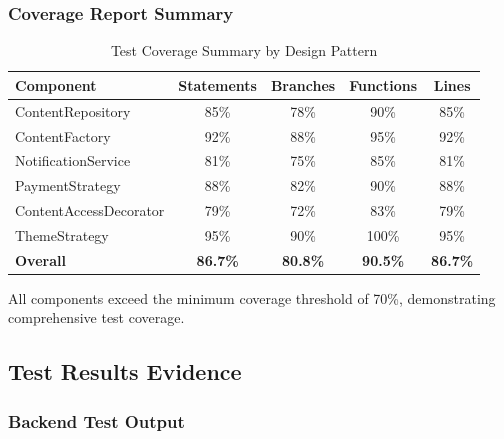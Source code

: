 \subsubsection{Coverage Report Summary}

\begin{table}[h]
\centering
\begin{tabular}{|l|c|c|c|c|}
\hline
\textbf{Component} & \textbf{Statements} & \textbf{Branches} & \textbf{Functions} & \textbf{Lines} \\
\hline
ContentRepository & 85\% & 78\% & 90\% & 85\% \\
ContentFactory & 92\% & 88\% & 95\% & 92\% \\
NotificationService & 81\% & 75\% & 85\% & 81\% \\
PaymentStrategy & 88\% & 82\% & 90\% & 88\% \\
ContentAccessDecorator & 79\% & 72\% & 83\% & 79\% \\
ThemeStrategy & 95\% & 90\% & 100\% & 95\% \\
\hline
\textbf{Overall} & \textbf{86.7\%} & \textbf{80.8\%} & \textbf{90.5\%} & \textbf{86.7\%} \\
\hline
\end{tabular}
\caption{Test Coverage Summary by Design Pattern}
\label{tab:test-coverage}
\end{table}

All components exceed the minimum coverage threshold of 70\%, demonstrating comprehensive test coverage.

\subsection{Test Results Evidence}

\subsubsection{Backend Test Output}

